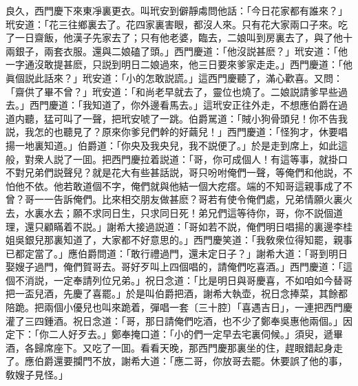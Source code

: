 良久，西門慶下來東凈裏更衣。叫玳安到僻靜䖏問他話：「今日花家都有誰來？」玳安道：「花三往鄉裏去了。花四家裏害眼，都沒人來。只有花大家兩口子來。吃了一日齋飯，他漢子先家去了；只有他老婆，臨去，二娘叫到房裏去了，與了他十兩銀子，兩套衣服。還與二娘磕了頭。」西門慶道：「他沒説甚麽？」玳安道：「他一字通沒敢提甚麽，只説到明日二娘過來，他三日要來爹家走走。」西門慶道：「他眞個説此話來？」玳安道：「小的怎敢説謊。」這西門慶聽了，滿心歡喜。又問：「齋供了畢不曾？」玳安道：「和尚老早就去了，靈位也燒了。二娘説請爹早些過去。」西門慶道：「我知道了，你外邊看馬去。」這玳安正往外走，不想應伯爵在過道内聽，猛可叫了一聲，把玳安唬了一跳。伯爵駡道：「賊小狗骨頭兒！你不告我説，我怎的也聽見了？原來你爹兒們幹的好繭兒！」西門慶道：「怪狗才，休要唱揚一地裏知道。」伯爵道：「你央及我央兒，我不説便了。」於是走到席上，如此這般，對衆人説了一囬。把西門慶拉着説道：「哥，你可成個人！有這等事，就掛口不對兄弟們説聲兒？就是花大有些甚話説，哥只吩咐俺們一聲，等俺們和他説，不怕他不依。他若敢道個不字，俺們就與他結一個大疙瘩。端的不知哥這親事成了不曾？哥一一告訴俺們。比來相交朋友做甚麽？哥若有使令俺們處，兄弟情願火裏火去，水裏水去；願不求同日生，只求同日死！弟兄們這等待你，哥，你不説個道理，還只顧瞞着不説。」謝希大接過説道：「哥如若不説，俺們明日唱揚的裏邊李桂姐吳銀兒那裏知道了，大家都不好意思的。」西門慶笑道：「我敎衆位得知罷，親事已都定當了。」應伯爵問道：「敢行禮過門，還未定日子？」謝希大道：「哥到明日娶嫂子過門，俺們賀哥去。哥好歹叫上四個唱的，請俺們吃喜酒。」西門慶道：「這個不消説，一定奉請列位兄弟。」祝日念道：「比是明日與哥慶喜，不如咱如今替哥把一盃兒酒，先慶了喜罷。」於是叫伯爵把酒，謝希大執壶，祝日念捧菜，其餘都陪跪。把兩個小優兒也叫來跪着，彈唱一套〔三十腔〕「喜遇吉日」，一連把西門慶灌了三四鍾酒。祝日念道：「哥，那日請俺們吃酒，也不少了鄭奉吳惠他兩個。」因定下：「你二人好歹去。」鄭奉掩口道：「小的們一定早去宅裏伺候。」須臾，遞畢酒，各歸席座下。又吃了一囬。看看天晚，那西門慶那裏坐的住，趕眼錯起身走了。應伯爵還要攔門不放，謝希大道：「應二哥，你放哥去罷。休要誤了他的事，敎嫂子見怪。」

